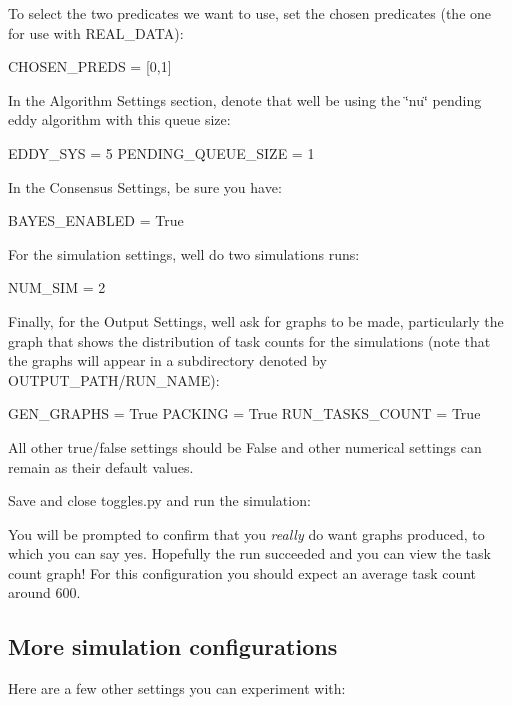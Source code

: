 \begin{DoxyVerb}
\begin{DoxyVerb}
To select the two predicates we want to use, set the chosen predicates (the one for use with {\ttfamily R\+E\+A\+L\+\_\+\+D\+A\+TA})\+: \begin{DoxyVerb}CHOSEN_PREDS = [0,1]
\end{DoxyVerb}


In the Algorithm Settings section, denote that we\textquotesingle{}ll be using the \char`\"{}nu\char`\"{} pending eddy algorithm with this queue size\+: \begin{DoxyVerb}EDDY_SYS = 5
PENDING_QUEUE_SIZE = 1
\end{DoxyVerb}


In the Consensus Settings, be sure you have\+: \begin{DoxyVerb}BAYES_ENABLED = True
\end{DoxyVerb}


For the simulation settings, we\textquotesingle{}ll do two simulations runs\+: \begin{DoxyVerb}NUM_SIM = 2
\end{DoxyVerb}


Finally, for the Output Settings, we\textquotesingle{}ll ask for graphs to be made, particularly the graph that shows the distribution of task counts for the simulations (note that the graphs will appear in a subdirectory denoted by {\ttfamily O\+U\+T\+P\+U\+T\+\_\+\+P\+A\+T\+H/\+R\+U\+N\+\_\+\+N\+A\+ME})\+: \begin{DoxyVerb}GEN_GRAPHS = True
PACKING = True
RUN_TASKS_COUNT = True
\end{DoxyVerb}


All other true/false settings should be {\ttfamily False} and other numerical settings can remain as their default values.

Save and close {\ttfamily toggles.\+py} and run the simulation\+: 


You will be prompted to confirm that you {\itshape really} do want graphs produced, to which you can say yes. Hopefully the run succeeded and you can view the task count graph! For this configuration you should expect an average task count around 600.\hypertarget{install_info_stats}{}\subsection{More simulation configurations}\label{install_info_stats}
Here are a few other settings you can experiment with\+:



\end{DoxyVerb}
\end{DoxyVerb}
